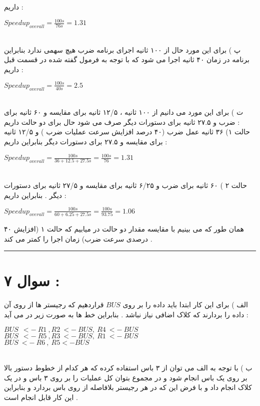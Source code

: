 \documentclass{article}
\begin{document}
داریم  : 
\begin{center}
	$Speedup_{overall}  = \frac{100s}{76s} = 1.31$
\end{center}
\\
پ ) برای این مورد حال از ۱۰۰ ثانیه اجرای برنامه ضرب هیچ سهمی ندارد بنابراین برنامه در زمان ۴۰ ثانیه اجرا می شود که با توجه به فرمول گفته شده در قسمت قبل داریم : 
\begin{center}
	$Speedup_{overall}  = \frac{100s}{40s} = 2.5$
\end{center}
\\
ت ) برای این مورد می دانیم از ۱۰۰ ثانیه ، ۱۲/۵ ثانیه برای مقایسه و ۶۰ ثانیه برای ضرب و ۲۷.۵ ثانیه برای دستورات دیگر صرف می شود حال برای دو حالت داریم  : 
\\ 
حالت ۱) ۳۶ ثانیه عمل ضرب (۴۰ درصد افزایش سرعت عملیات ضرب ) و ۱۲/۵ ثانیه برای مقایسه و ۲۷.۵ برای دستورات دیگر  بنابراین داریم  : 
\begin{center}
  $Speedup_{overall}  = \frac{100s}{36 + 12.5 + 27.5s} = \frac{100s}{76} = 1.31$
\end{center}
\\
حالت ۲ ) ۶۰ ثانیه برای ضرب و ۶/۲۵ ثانیه برای مقایسه و ۲۷/۵ ثانیه برای دستورات دیگر . بنابراین داریم : 
\begin{center}
 $Speedup_{overall}  = \frac{100s}{60 + 6.25 + 27.5s} = \frac{100s}{93.75} = 1.06$
\end{center}
همان طور که می بینیم با مقایسه مقدار دو حالت در میابیم که حالت ۱ (افزایش ۴۰ درصدی سرعت ضرب) زمان اجرا را کمتر می کند  . 
\hrule
\section*{سوال ۷ : }
الف  ) برای این کار ابتدا باید داده را بر روی 
$BUS$
قراردهیم که رجیستر ها از روی آن داده را بردارند که کلاک اضافی نیاز نباشد . بنابراین خط ها به صورت زیر در می آید  : 

\begin{center}
	$ BUS \   \ <- \  R1  \  ,R2  \ <- \ BUS ,  \ R4  \ <- \ BUS $\\
	$ BUS \   \ <- \  R5  \  ,R3  \ <- \ BUS ,  \ R1  \ <- \ BUS $\\
	$ BUS \ <- \ R6 \  , \ R5 <- BUS $
\end{center}
 \\
 ب ) با توجه به الف می توان از ۳ باس استفاده کرده که هر کدام از خطوط دستور بالا بر روی یک باس انجام شود و در مجموع بتوان کل عملیات را بر روی ۳ باس و در یک کلاک انجام داد و با فرض این که در هر رجیستر بلافاصله از روی باس بردارد و بنابراین این کار قابل انجام است  . 
\end{document}
